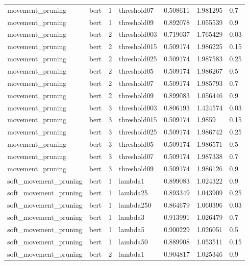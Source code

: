 \begin{tabular}{lllllll}
     movement\_pruning &  bert &   1 &  threshold07 &  0.508611 &  1.981295 &    0.7 \\
     movement\_pruning &  bert &   1 &  threshold09 &  0.892078 &  1.055539 &    0.9 \\
     movement\_pruning &  bert &   2 & threshold003 &  0.719037 &  1.765429 &   0.03 \\
     movement\_pruning &  bert &   2 & threshold015 &  0.509174 &  1.986225 &   0.15 \\
     movement\_pruning &  bert &   2 & threshold025 &  0.509174 &  1.987583 &   0.25 \\
     movement\_pruning &  bert &   2 &  threshold05 &  0.509174 &  1.986267 &    0.5 \\
     movement\_pruning &  bert &   2 &  threshold07 &  0.509174 &  1.985793 &    0.7 \\
     movement\_pruning &  bert &   2 &  threshold09 &  0.899083 &  1.056446 &    0.9 \\
     movement\_pruning &  bert &   3 & threshold003 &  0.806193 &  1.424574 &   0.03 \\
     movement\_pruning &  bert &   3 & threshold015 &  0.509174 &    1.9859 &   0.15 \\
     movement\_pruning &  bert &   3 & threshold025 &  0.509174 &  1.986742 &   0.25 \\
     movement\_pruning &  bert &   3 &  threshold05 &  0.509174 &  1.986571 &    0.5 \\
     movement\_pruning &  bert &   3 &  threshold07 &  0.509174 &  1.987338 &    0.7 \\
     movement\_pruning &  bert &   3 &  threshold09 &  0.509174 &  1.986126 &    0.9 \\
soft\_movement\_pruning &  bert &   1 &      lambda1 &  0.899083 &  1.024322 &    0.9 \\
soft\_movement\_pruning &  bert &   1 &     lambda25 &  0.893349 &  1.043909 &   0.25 \\
soft\_movement\_pruning &  bert &   1 &    lambda250 &  0.864679 &  1.060396 &   0.03 \\
soft\_movement\_pruning &  bert &   1 &      lambda3 &  0.913991 &  1.026479 &    0.7 \\
soft\_movement\_pruning &  bert &   1 &      lambda5 &  0.900229 &  1.026051 &    0.5 \\
soft\_movement\_pruning &  bert &   1 &     lambda50 &  0.889908 &  1.053511 &   0.15 \\
soft\_movement\_pruning &  bert &   2 &      lambda1 &  0.904817 &  1.025346 &    0.9 \\

\end{tabular}
